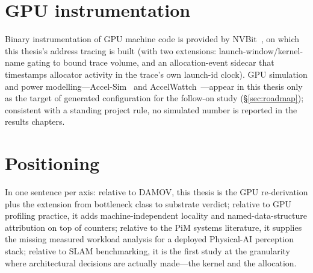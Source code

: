 \section{GPU instrumentation}

Binary instrumentation of GPU machine code is provided by
NVBit~\cite{villa2019nvbit}, on which this thesis's address tracing is
built (with two extensions: launch-window/kernel-name gating to bound
trace volume, and an allocation-event sidecar that timestamps allocator
activity in the trace's own launch-id clock). GPU simulation and power
modelling---Accel-Sim~\cite{khairy2020accelsim} and
AccelWattch~\cite{kandiah2021accelwattch}---appear in this thesis only as
the target of generated configuration for the follow-on study
(\S\ref{sec:roadmap}); consistent with a standing project rule, no simulated
number is reported in the results chapters.

\section{Positioning}

In one sentence per axis: relative to DAMOV, this thesis is the GPU
re-derivation plus the extension from bottleneck class to substrate verdict;
relative to GPU profiling practice, it adds machine-independent locality and
named-data-structure attribution on top of counters; relative to the PiM
systems literature, it supplies the missing measured workload analysis for a
deployed Physical-AI perception stack; relative to SLAM benchmarking, it is
the first study at the granularity where architectural decisions are
actually made---the kernel and the allocation.
